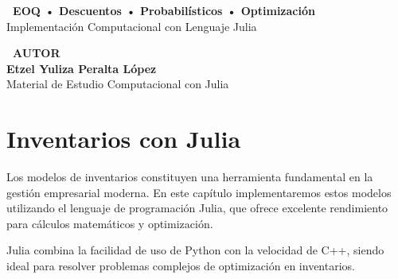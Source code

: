 \documentclass[12pt,a4paper]{book}
\begin{document}
\begin{titlepage}
		\begin{tcolorbox}[colback=violetaclaro,colframe=moradoacento,boxrule=2pt,arc=10pt]
			\centering
			{\large\bfseries\color{moradoacento} \faLightbulb\ EOQ • Descuentos • Probabil\'isticos • Optimizaci\'on}\\[0.3cm]
			{\normalsize\color{grisoScuro} Implementaci\'on Computacional con Lenguaje Julia}
		\end{tcolorbox}
		
		\vfill
		
		\begin{tcolorbox}[colback=grisclaro,colframe=grisoScuro,boxrule=2pt,arc=8pt,drop shadow]
			\centering
			{\Large\bfseries\color{azulprincipal} \faUser\ AUTOR}\\[0.5cm]
			{\LARGE\bfseries\color{rojoacento} Etzel Yuliza Peralta L\'opez}\\[0.3cm]
			{\large\color{grisoScuro} Material de Estudio Computacional con Julia}
		\end{tcolorbox}
		
	\end{titlepage}
	
	\newpage
	
	\begin{tcolorbox}[colback=azulclaro,colframe=azulprincipal,boxrule=2pt,arc=10pt,title={\Large\bfseries\color{white} \faList\ CONTENIDO DEL CAP\'ITULO}]
		\tableofcontents
	\end{tcolorbox}
	
	\newpage
	
	\chapter{Inventarios con Julia}
	
	\begin{tcolorbox}[colback=naranjaclaro,colframe=naranjaacento,boxrule=2pt,arc=10pt,title={\large\bfseries\color{white} \faInfoCircle\ INTRODUCCI\'ON}]
		
		Los modelos de inventarios constituyen una herramienta fundamental en la gesti\'on empresarial moderna. En este cap\'itulo implementaremos estos modelos utilizando el lenguaje de programaci\'on Julia, que ofrece excelente rendimiento para c\'alculos matem\'aticos y optimizaci\'on.
		
		Julia combina la facilidad de uso de Python con la velocidad de C++, siendo ideal para resolver problemas complejos de optimizaci\'on en inventarios.
		
	\end{tcolorbox}
	
\end{document}
